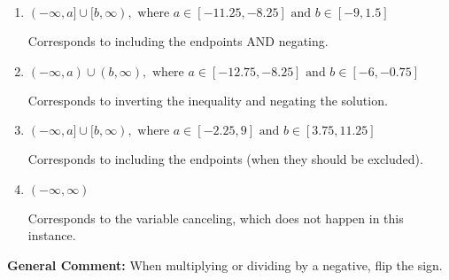 \documentclass{extbook}[14pt]
\begin{document}
\begin{enumerate}
{\begin{enumerate}[label=\Alph*.]
 * Correct option.
\item \( (-\infty, a] \cup [b, \infty), \text{ where } a \in [-11.25, -8.25] \text{ and } b \in [-9, 1.5] \)

Corresponds to including the endpoints AND negating.
\item \( (-\infty, a) \cup (b, \infty), \text{ where } a \in [-12.75, -8.25] \text{ and } b \in [-6, -0.75] \)

Corresponds to inverting the inequality and negating the solution.
\item \( (-\infty, a] \cup [b, \infty), \text{ where } a \in [-2.25, 9] \text{ and } b \in [3.75, 11.25] \)

Corresponds to including the endpoints (when they should be excluded).
\item \( (-\infty, \infty) \)

Corresponds to the variable canceling, which does not happen in this instance.
\end{enumerate}

\textbf{General Comment:} When multiplying or dividing by a negative, flip the sign.
}
\end{enumerate}
\end{document}
